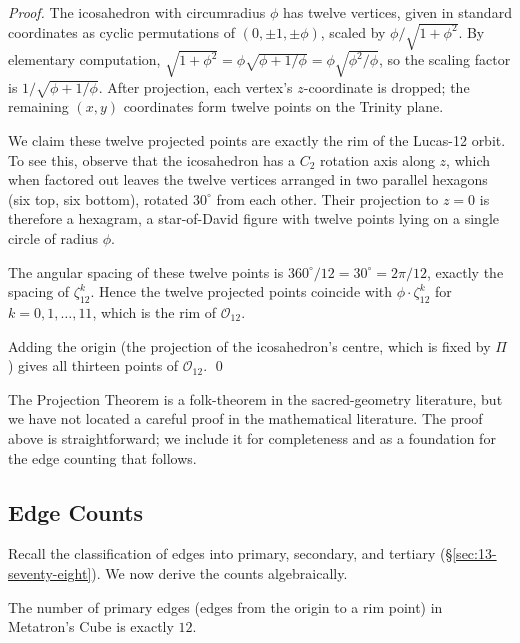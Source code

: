 \begin{proof}
The icosahedron with circumradius $\phi$ has twelve vertices, given
in standard coordinates as cyclic permutations of
$(0, \pm 1, \pm \phi)$, scaled by $\phi / \sqrt{1+\phi^{2}}$. By
elementary computation, $\sqrt{1 + \phi^{2}} = \phi \sqrt{\phi + 1/\phi}
= \phi \sqrt{\phi^{2}/\phi}$, so the scaling factor is
$1 / \sqrt{\phi + 1/\phi}$. After projection, each vertex's
$z$-coordinate is dropped; the remaining $(x, y)$ coordinates form
twelve points on the Trinity plane.

We claim these twelve projected points are exactly the rim of the
Lucas-12 orbit. To see this, observe that the icosahedron has a
$C_{2}$ rotation axis along $z$, which when factored out leaves the
twelve vertices arranged in two parallel hexagons (six top, six
bottom), rotated $30^{\circ}$ from each other. Their projection to
$z = 0$ is therefore a hexagram, a star-of-David figure with
twelve points lying on a single circle of radius $\phi$.

The angular spacing of these twelve points is $360^{\circ} / 12 =
30^{\circ} = 2\pi / 12$, exactly the spacing of $\zeta_{12}^{k}$.
Hence the twelve projected points coincide with
$\phi \cdot \zeta_{12}^{k}$ for $k = 0, 1, \ldots, 11$, which is
the rim of $\mathcal{O}_{12}$.

Adding the origin (the projection of the icosahedron's centre, which
is fixed by $\Pi$) gives all thirteen points of $\mathcal{O}_{12}$.
\qed
\end{proof}

\begin{remark}
The Projection Theorem is a folk-theorem in the sacred-geometry
literature, but we have not located a careful proof in the
mathematical literature. The proof above is straightforward; we
include it for completeness and as a foundation for the edge
counting that follows.
\end{remark}

\subsection{Edge Counts}
\label{sec:13-edge-counts}

Recall the classification of edges into primary, secondary, and
tertiary (\S\ref{sec:13-seventy-eight}). We now derive the counts
algebraically.

\begin{lemma}
\label{lem:13-primary}
The number of primary edges (edges from the origin to a rim point)
in Metatron's Cube is exactly $12$.
\end{lemma}


